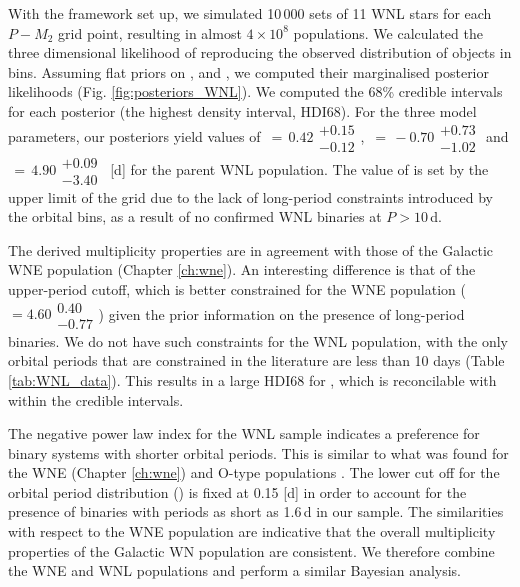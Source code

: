 With the framework set up, we simulated 10\,000 sets of 11 WNL stars for each $P-M_2$ grid point, resulting in almost $4 \times 10^8$ populations. We calculated the three dimensional likelihood of reproducing the observed distribution of objects in \DelRV{} bins. Assuming flat priors on \logPmaxWNL{}, \piWNL{} and \fintWNL{}, we computed their marginalised posterior likelihoods (Fig. \ref{fig:posteriors_WNL}). We computed the 68\% credible intervals for each posterior (the highest density interval, HDI68). For the three model parameters, our posteriors yield values of \fintWNL{}$\,=\,0.42\substack{+0.15 \\ -0.12}$, \piWNL{}$\,=\,-0.70\substack{+0.73 \\ -1.02}$ and \logPmaxWNL$\,=\,4.90\substack{+0.09 \\ -3.40}\,$ [d] for the parent WNL population. The value of \logPmaxWNL{} is set by the upper limit of the grid due to the lack of long-period constraints introduced by the orbital bins, as a result of no confirmed WNL binaries at $P>10\,$d.

The derived multiplicity properties are in agreement with those of the Galactic WNE population (Chapter \ref{ch:wne}). An interesting difference is that of the upper-period cutoff, which is better constrained for the WNE population (\logPmaxWNE{}\,$= 4.60\substack{0.40 \\ -0.77}$) given the prior information on the presence of long-period binaries. We do not have such constraints for the WNL population, with the only orbital periods that are constrained in the literature are less than 10 days (Table \ref{tab:WNL_data}). This results in a large HDI68 for \logPmaxWNL{}, which is reconcilable with \logPmaxWNE{} within the credible intervals.

The negative power law index for the WNL sample indicates a preference for binary systems with shorter orbital periods. This is similar to what was found for the WNE (Chapter \ref{ch:wne}) and O-type populations \citep{sana_binary_2012}. The lower cut off for the orbital period distribution (\logPminWNL{}) is fixed at 0.15 [d] in order to account for the presence of binaries with periods as short as 1.6\,d in our sample. The similarities with respect to the WNE population are indicative that the overall multiplicity properties of the Galactic WN population are consistent. We therefore combine the WNE and WNL populations and perform a similar Bayesian analysis.


